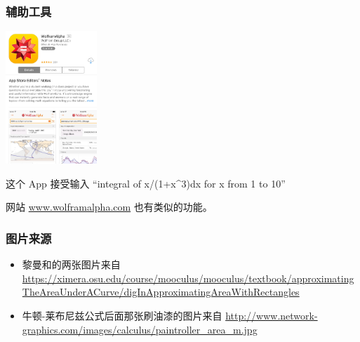 \documentclass[CJK]{beamer}
\begin{document}
\begin{frame}
\frametitle{辅助工具}
\begin{center}
\includegraphics[height=5cm]{graph8.jpeg}
\end{center}
这个 App 接受输入
``integral of x/(1+x\^{}3)dx for x from 1 to 10''

网站 \url{www.wolframalpha.com} 也有类似的功能。 
\end{frame}

\begin{frame}
\frametitle{图片来源}
\begin{itemize}
	\item 黎曼和的两张图片来自 \url{https://ximera.osu.edu/course/mooculus/mooculus/textbook/approximatingTheAreaUnderACurve/digInApproximatingAreaWithRectangles}
	\item 牛顿-莱布尼兹公式后面那张刷油漆的图片来自 \url{http://www.network-graphics.com/images/calculus/paintroller_area_m.jpg}
\end{itemize} 
\end{frame}
\end{document}
